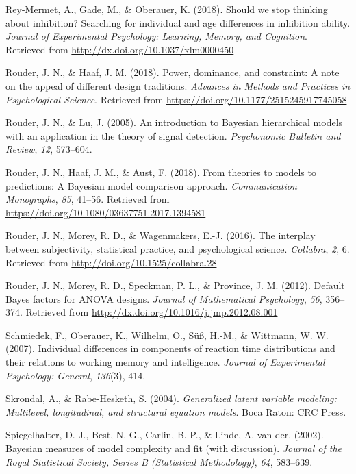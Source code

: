\documentclass[english,man]{apa6}
\theoremstyle{definition}
\theoremstyle{definition}
\theoremstyle{remark}
\begin{document}
\hypertarget{ref-ReyMermet:etal:2018}{}
Rey-Mermet, A., Gade, M., \& Oberauer, K. (2018). Should we stop
thinking about inhibition? Searching for individual and age differences
in inhibition ability. \emph{Journal of Experimental Psychology:
Learning, Memory, and Cognition}. Retrieved from
\url{http://dx.doi.org/10.1037/xlm0000450}

\hypertarget{ref-Rouder:Haaf:2018a}{}
Rouder, J. N., \& Haaf, J. M. (2018). Power, dominance, and constraint:
A note on the appeal of different design traditions. \emph{Advances in
Methods and Practices in Psychological Science}. Retrieved from
\url{https://doi.org/10.1177/2515245917745058}

\hypertarget{ref-Rouder:Lu:2005}{}
Rouder, J. N., \& Lu, J. (2005). An introduction to Bayesian
hierarchical models with an application in the theory of signal
detection. \emph{Psychonomic Bulletin and Review}, \emph{12}, 573--604.

\hypertarget{ref-Rouder:etal:2018}{}
Rouder, J. N., Haaf, J. M., \& Aust, F. (2018). From theories to models
to predictions: A Bayesian model comparison approach.
\emph{Communication Monographs}, \emph{85}, 41--56. Retrieved from
\url{https://doi.org/10.1080/03637751.2017.1394581}

\hypertarget{ref-Rouder:etal:2016b}{}
Rouder, J. N., Morey, R. D., \& Wagenmakers, E.-J. (2016). The interplay
between subjectivity, statistical practice, and psychological science.
\emph{Collabra}, \emph{2}, 6. Retrieved from
\url{http://doi.org/10.1525/collabra.28}

\hypertarget{ref-Rouder:etal:2012}{}
Rouder, J. N., Morey, R. D., Speckman, P. L., \& Province, J. M. (2012).
Default Bayes factors for ANOVA designs. \emph{Journal of Mathematical
Psychology}, \emph{56}, 356--374. Retrieved from
\url{http://dx.doi.org/10.1016/j.jmp.2012.08.001}

\hypertarget{ref-Schmiedek:etal:2007}{}
Schmiedek, F., Oberauer, K., Wilhelm, O., Süß, H.-M., \& Wittmann, W. W.
(2007). Individual differences in components of reaction time
distributions and their relations to working memory and intelligence.
\emph{Journal of Experimental Psychology: General}, \emph{136}(3), 414.

\hypertarget{ref-Skrondal:Rabe-Hesketh:2004}{}
Skrondal, A., \& Rabe-Hesketh, S. (2004). \emph{Generalized latent
variable modeling: Multilevel, longitudinal, and structural equation
models}. Boca Raton: CRC Press.

\hypertarget{ref-Spiegelhalter:etal:2002}{}
Spiegelhalter, D. J., Best, N. G., Carlin, B. P., \& Linde, A. van der.
(2002). Bayesian measures of model complexity and fit (with discussion).
\emph{Journal of the Royal Statistical Society, Series B (Statistical
Methodology)}, \emph{64}, 583--639.
\end{document}
